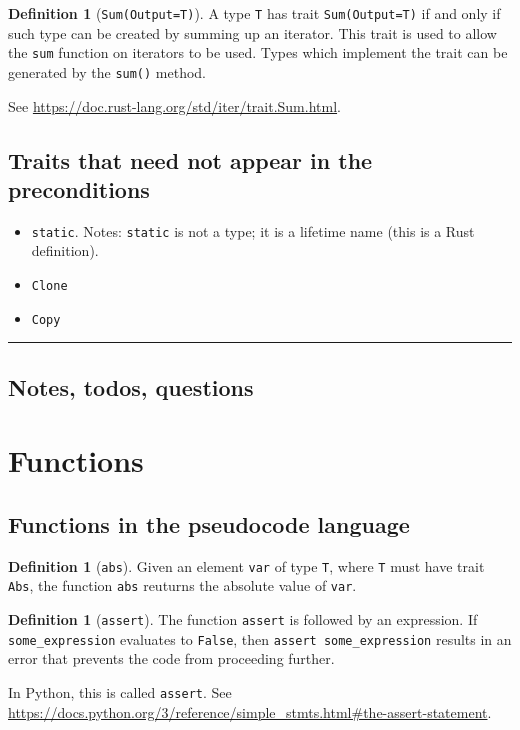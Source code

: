 \documentclass[11pt,a4paper]{article}
\theoremstyle{definition}
\newtheorem{definition}[theorem]{Definition}
\newcommand{\horizline}{\noindent\rule{\textwidth}{1pt}}
\newcommand{\inRust}[2]{See \url{#2}.}
\newcommand{\inPython}[2]{In Python, this is called \texttt{#1}. See \url{#2}.}
\begin{document}
\begin{definition}[\texttt{Sum(Output=T)}]
    A type \texttt{T} has trait \texttt{Sum(Output=T)} if and only if such type can be created by summing up an iterator. This trait is used to allow the \texttt{sum} function on iterators to be used. Types which implement the trait can be generated by the \texttt{sum()} method.
    
    \inRust{Trait std::iter::Sum}{https://doc.rust-lang.org/std/iter/trait.Sum.html}
\end{definition}

\subsection{Traits that need not appear in the preconditions}
\begin{itemize}
    \item \texttt{\textquotesingle static}. Notes: \texttt{\textquotesingle static} is not a type; it is a lifetime name (this is a Rust definition).
    \item \texttt{Clone}
    \item \texttt{Copy}
\end{itemize}

\horizline

\subsection{Notes, todos, questions}

\section{Functions}

\subsection{Functions in the pseudocode language}

\begin{definition}[\texttt{abs}]
    Given an element \texttt{var} of type \texttt{T}, where \texttt{T} must have trait \texttt{Abs}, the function \texttt{abs} reuturns the absolute value of \texttt{var}.
\end{definition}

\begin{definition}[\texttt{assert}] 
    The function \texttt{assert} is followed by an expression. If \texttt{some\_expression} evaluates to \texttt{False}, then \texttt{assert some\_expression} results in an error that prevents the code from proceeding further. 
    
    \inPython{\texttt{assert}}{https://docs.python.org/3/reference/simple_stmts.html\#the-assert-statement}
\end{definition}
\end{document}

